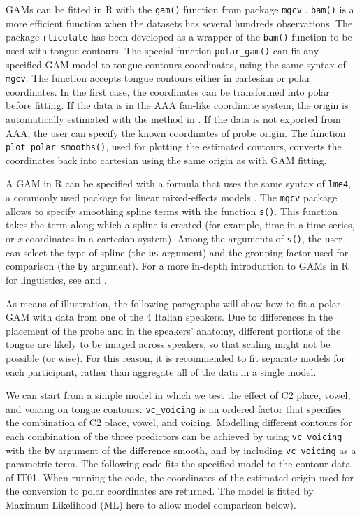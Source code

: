 \documentclass[12pt,]{article}
\begin{document}
GAMs can be fitted in R with the \texttt{gam()} function from package
\texttt{mgcv} \citep{wood2011, wood2017}. \texttt{bam()} is a more
efficient function when the datasets has several hundreds observations.
The package \texttt{rticulate} has been developed as a wrapper of the
\texttt{bam()} function to be used with tongue contours. The special
function \texttt{polar\_gam()} can fit any specified GAM model to tongue
contours coordinates, using the same syntax of \texttt{mgcv}. The
function accepts tongue contours either in cartesian or polar
coordinates. In the first case, the coordinates can be transformed into
polar before fitting. If the data is in the AAA fan-like coordinate
system, the origin is automatically estimated with the method in
\citet{heyne2015a}. If the data is not exported from AAA, the user can
specify the known coordinates of probe origin. The function
\texttt{plot\_polar\_smooths()}, used for plotting the estimated
contours, converts the coordinates back into cartesian using the same
origin as with GAM fitting.

A GAM in R can be specified with a formula that uses the same syntax of
\texttt{lme4}, a commonly used package for linear mixed-effects models
\citep{bates2015}. The \texttt{mgcv} package allows to specify smoothing
spline terms with the function \texttt{s()}. This function takes the
term along which a spline is created (for example, time in a time
series, or \emph{x}-coordinates in a cartesian system). Among the
arguments of \texttt{s()}, the user can select the type of spline (the
\texttt{bs} argument) and the grouping factor used for comparison (the
\texttt{by} argument). For a more in-depth introduction to GAMs in R for
linguistics, see \citet{soskuthy2017} and \citet{wieling2017}.

As means of illustration, the following paragraphs will show how to fit
a polar GAM with data from one of the 4 Italian speakers. Due to
differences in the placement of the probe and in the speakers' anatomy,
different portions of the tongue are likely to be imaged across
speakers, so that scaling might not be possible (or wise). For this
reason, it is recommended to fit separate models for each participant,
rather than aggregate all of the data in a single model.

We can start from a simple model in which we test the effect of C2
place, vowel, and voicing on tongue contours. \texttt{vc\_voicing} is an
ordered factor that specifies the combination of C2 place, vowel, and
voicing. Modelling different contours for each combination of the three
predictors can be achieved by using \texttt{vc\_voicing} with the
\texttt{by} argument of the difference smooth, and by including
\texttt{vc\_voicing} as a parametric term. The following code fits the
specified model to the contour data of IT01. When running the code, the
coordinates of the estimated origin used for the conversion to polar
coordinates are returned. The model is fitted by Maximum Likelihood (ML)
here to allow model comparison below).
\end{document}
